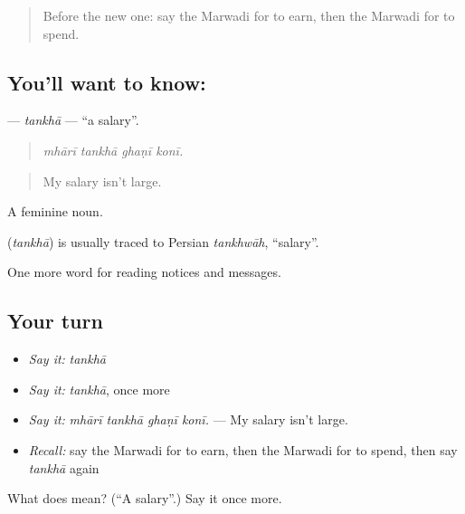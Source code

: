 \label{lesson:MW-C194-tankha}



\begin{quote}
Before the new one: say the Marwadi for to earn, then the Marwadi for to spend.
\end{quote}

\subsection*{You'll want to know: }
\textbf{} — \emph{tankhā} — \textquotedblleft{}a salary\textquotedblright{}.

\begin{quote}
   
\end{quote}

\begin{quote}
\emph{mhārī tankhā ghaṇī konī.}
\end{quote}

\begin{quote}
My salary isn't large.
\end{quote}

A feminine noun.

\begin{cousinweb}
\textbf{} (\emph{tankhā}) is usually traced to Persian \emph{tankhwāh}, \textquotedblleft{}salary\textquotedblright{}.
\end{cousinweb}

\begin{grammarlens}[title={What you've built}]
One more word for reading notices and messages.
\end{grammarlens}

\subsection*{Your turn}
\begin{itemize}
\raggedright
  \item \emph{Say it:} \emph{tankhā}
  \item \emph{Say it:} \emph{tankhā}, once more
  \item \emph{Say it:} \emph{mhārī tankhā ghaṇī konī.} — My salary isn't large.
  \item \emph{Recall:} say the Marwadi for to earn, then the Marwadi for to spend, then say \emph{tankhā} again
\end{itemize}

\begin{tcolorbox}[breakable,colback=teal!4,colframe=teal!35!black,title={Before you move on}]
What does  mean? (\textquotedblleft{}A salary\textquotedblright{}.) Say it once more.
\end{tcolorbox}
